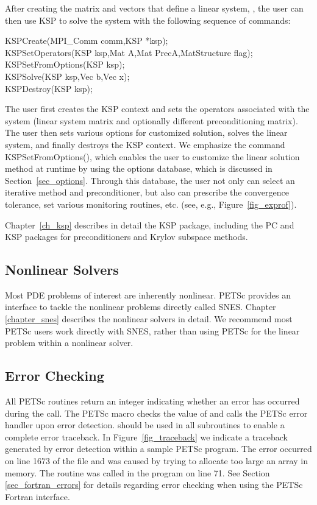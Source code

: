 After creating the matrix and vectors that define a linear system,
, the user can then use KSP to solve the system
with the following sequence of commands:
\begin{tabbing}
  KSPCreate(MPI\_Comm comm,KSP *ksp); \\
  KSPSetOperators(KSP ksp,Mat A,Mat PrecA,MatStructure flag);\\
  KSPSetFromOptions(KSP ksp);\\
  KSPSolve(KSP ksp,Vec b,Vec x);\\
  KSPDestroy(KSP ksp);
\end{tabbing}
The user first creates the KSP context and sets the operators
associated with the system (linear system matrix and optionally different
preconditioning matrix).  The user then sets various options for
customized solution, solves the linear system, and finally destroys
the KSP context.  We emphasize the command KSPSetFromOptions(),
which enables the user to customize the linear solution
method at runtime by using the options database, which is discussed in
Section~\ref{sec_options}. Through this database, the user not only
can select an iterative method and preconditioner, but also can prescribe
the convergence tolerance, set various monitoring routines, etc.
(see, e.g., Figure~\ref{fig_exprof}).

Chapter~\ref{ch_ksp} describes in detail the KSP package, including
the PC and KSP packages for preconditioners and Krylov subspace methods.

\subsection*{Nonlinear Solvers}
Most PDE problems of interest are inherently nonlinear. PETSc provides
an interface to tackle the nonlinear problems directly called SNES. Chapter
\ref{chapter_snes} describes the nonlinear solvers in detail. We recommend
most PETSc users work directly with SNES, rather than using PETSc
for the linear problem within a nonlinear solver.

\subsection*{Error Checking}

All PETSc routines return an integer indicating whether an error
has occurred during the call.  The PETSc macro 
checks the value of  and calls the PETSc error handler
upon error detection.   should be used in all
subroutines to enable a complete error traceback.
In Figure~\ref{fig_traceback} we indicate a
traceback generated by error detection within a sample PETSc
program. The error occurred on line 1673 of the file  and was caused by trying to allocate too
large an array in memory. The routine was called in the program
 on line 71.  See Section \ref{sec_fortran_errors} for
details regarding error checking when using the PETSc Fortran interface.

